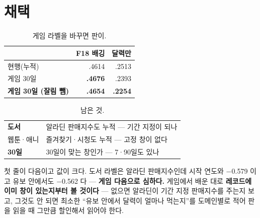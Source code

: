 \documentclass[10pt]{article}
\begin{document}

\section{채택}

\begin{table}[t]
\centering\tsize
\caption{게임 라벨을 바꾸면 판이.}
\begin{tabular}{lrr}
\toprule
& F18 배깅 & 달력만 \\
\midrule
현행(누적) & .4614 & .2513 \\
게임 30일 & \textbf{.4676} & .2393 \\
\textbf{게임 30일 (잘림 뺌)} & \textbf{.4654} & \textbf{.2254} \\
\bottomrule
\end{tabular}
\end{table}



\begin{table}[t]
\centering\tsize
\caption{남은 것.}
\begin{tabular}{ll}
\toprule
\textbf{도서} & 알라딘 판매지수도 누적 --- 기간 지정이 되나 \\
웹툰·애니 & 즐겨찾기·시청도 누적 --- 고정 창이 없다 \\
\textbf{30일} & 30일이 맞는 창인가 --- 7·90일도 있나 \\
\bottomrule
\end{tabular}
\end{table}

첫 줄이 다음이고 값이 크다. 도서 라벨은 알라딘 판매지수인데 시작 연도와
$-$0.579 이고 유보 안에서도 $-$0.562 다 --- \textbf{게임 다음으로 심하다.}
게임에서 배운 대로 \textbf{레코드에 이미 창이 있는지부터 볼 것이다} ---
없으면 알라딘이 기간 지정 판매지수를 주는지 보고, 그것도 안 되면 최소한
``유보 안에서 달력이 얼마나 먹는지''를 도메인별로 적어 판을 읽을 때 그만큼
할인해서 읽어야 한다.
\end{document}
